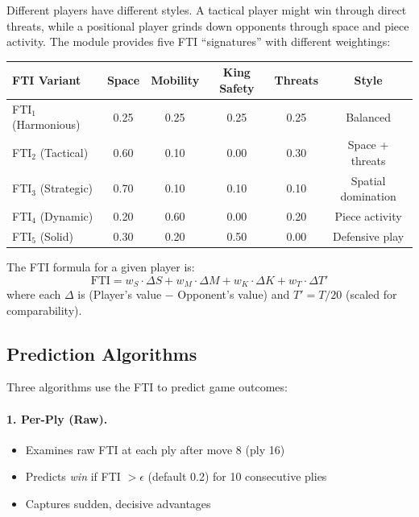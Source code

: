 \documentclass[12pt]{book}
\begin{document}
Different players have different styles. A tactical player might win through direct threats, while a positional player grinds down opponents through space and piece activity. The module provides five FTI ``signatures'' with different weightings:

\begin{center}
\begin{tabular}{lccccc}
\toprule
\textbf{FTI Variant} & \textbf{Space} & \textbf{Mobility} & \textbf{King Safety} & \textbf{Threats} & \textbf{Style} \\
\midrule
FTI$_1$ (Harmonious) & 0.25 & 0.25 & 0.25 & 0.25 & Balanced \\
FTI$_2$ (Tactical) & 0.60 & 0.10 & 0.00 & 0.30 & Space + threats \\
FTI$_3$ (Strategic) & 0.70 & 0.10 & 0.10 & 0.10 & Spatial domination \\
FTI$_4$ (Dynamic) & 0.20 & 0.60 & 0.00 & 0.20 & Piece activity \\
FTI$_5$ (Solid) & 0.30 & 0.20 & 0.50 & 0.00 & Defensive play \\
\bottomrule
\end{tabular}
\end{center}

The FTI formula for a given player is:
\begin{equation}
\text{FTI} = w_S \cdot \Delta S + w_M \cdot \Delta M + w_K \cdot \Delta K + w_T \cdot \Delta T'
\end{equation}
where each $\Delta$ is (Player's value $-$ Opponent's value) and $T' = T / 20$ (scaled for comparability).

\subsection{Prediction Algorithms}

Three algorithms use the FTI to predict game outcomes:

\paragraph{1. Per-Ply (Raw).}
\begin{itemize}
    \item Examines raw FTI at each ply after move 8 (ply 16)
    \item Predicts {\it win} if FTI $> \epsilon$ (default 0.2) for 10 consecutive plies
    \item Captures sudden, decisive advantages
\end{itemize}
\end{document}
